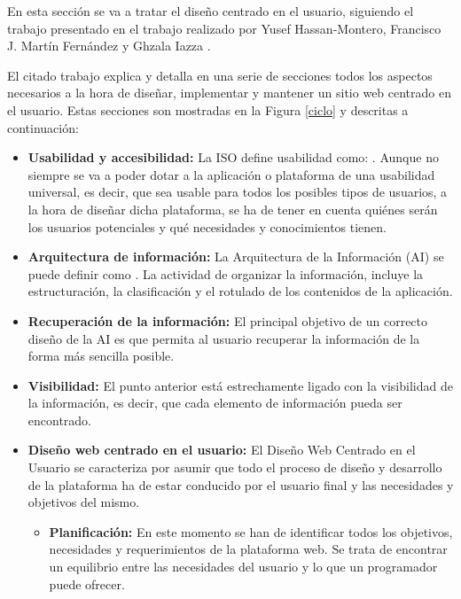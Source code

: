 En esta sección se va a tratar el diseño centrado en el usuario, siguiendo el trabajo presentado en el trabajo realizado por Yusef Hassan-Montero, Francisco J. Martín Fernández y Ghzala Iazza \cite{montero:info}.

El citado trabajo explica y detalla en una serie de secciones todos los aspectos necesarios a la hora de diseñar, implementar y mantener un sitio web centrado en el usuario. Estas secciones son mostradas en la Figura \ref{ciclo} y descritas a continuación:

\begin{itemize}
	\item \textbf{Usabilidad y accesibilidad:} La ISO define usabilidad como: . Aunque no siempre se va a poder dotar a la aplicación o plataforma de una usabilidad universal, es decir, que sea usable para todos los posibles tipos de usuarios, a la hora de diseñar dicha plataforma, se ha de tener en cuenta quiénes serán los usuarios potenciales y qué necesidades y conocimientos tienen.
	\item \textbf{Arquitectura de información:} La Arquitectura de la Información (AI) se puede definir como . La actividad de organizar la información, incluye la estructuración, la clasificación y el rotulado de los contenidos de la aplicación.
	\item \textbf{Recuperación de la información:} El principal objetivo de un correcto diseño de la AI es que permita al usuario recuperar la información de la forma más sencilla posible.
	\item \textbf{Visibilidad:} El punto anterior está estrechamente ligado con la visibilidad de la información, es decir, que cada elemento de información pueda ser encontrado.
	\item \textbf{Diseño web centrado en el usuario:} 
El Diseño Web Centrado en el Usuario se caracteriza por asumir que todo el proceso de diseño y desarrollo de la plataforma ha de estar conducido por el usuario final y las necesidades y objetivos del mismo.
	\begin{itemize}
		\item \textbf{Planificación:} En este momento se han de identificar todos los objetivos, necesidades y requerimientos de la plataforma web. Se trata de encontrar un equilibrio entre las necesidades del usuario y lo que un programador puede ofrecer.

\end{itemize}
\end{itemize}
